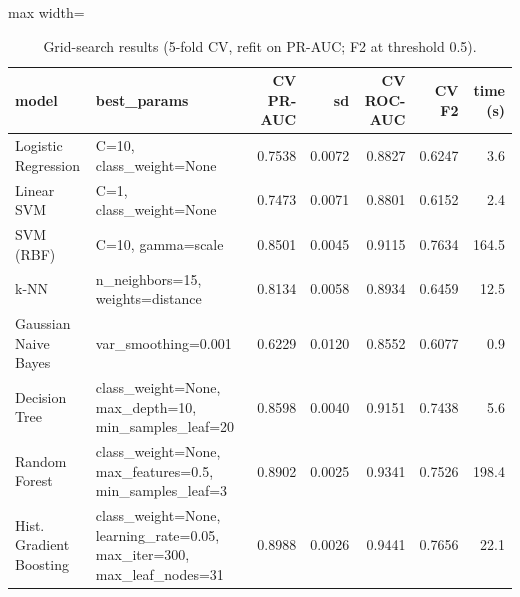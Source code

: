 \begin{table}[H]
\centering
\scriptsize
\begin{adjustbox}{max width=\linewidth}
\begin{tabular}{lp{5.4cm}rrrrr}
\toprule
model & best\_params & CV PR-AUC & sd & CV ROC-AUC & CV F2 & time (s) \\
\midrule
Logistic Regression & C=10, class\_weight=None & 0.7538 & 0.0072 & 0.8827 & 0.6247 & 3.6 \\
Linear SVM & C=1, class\_weight=None & 0.7473 & 0.0071 & 0.8801 & 0.6152 & 2.4 \\
SVM (RBF) & C=10, gamma=scale & 0.8501 & 0.0045 & 0.9115 & 0.7634 & 164.5 \\
k-NN & n\_neighbors=15, weights=distance & 0.8134 & 0.0058 & 0.8934 & 0.6459 & 12.5 \\
Gaussian Naive Bayes & var\_smoothing=0.001 & 0.6229 & 0.0120 & 0.8552 & 0.6077 & 0.9 \\
Decision Tree & class\_weight=None, max\_depth=10, min\_samples\_leaf=20 & 0.8598 & 0.0040 & 0.9151 & 0.7438 & 5.6 \\
Random Forest & class\_weight=None, max\_features=0.5, min\_samples\_leaf=3 & 0.8902 & 0.0025 & 0.9341 & 0.7526 & 198.4 \\
Hist. Gradient Boosting & class\_weight=None, learning\_rate=0.05, max\_iter=300, max\_leaf\_nodes=31 & 0.8988 & 0.0026 & 0.9441 & 0.7656 & 22.1 \\
\bottomrule
\end{tabular}
\end{adjustbox}
\caption{Grid-search results (5-fold CV, refit on PR-AUC; F2 at threshold 0.5).}
\label{tab:tuning}
\end{table}
